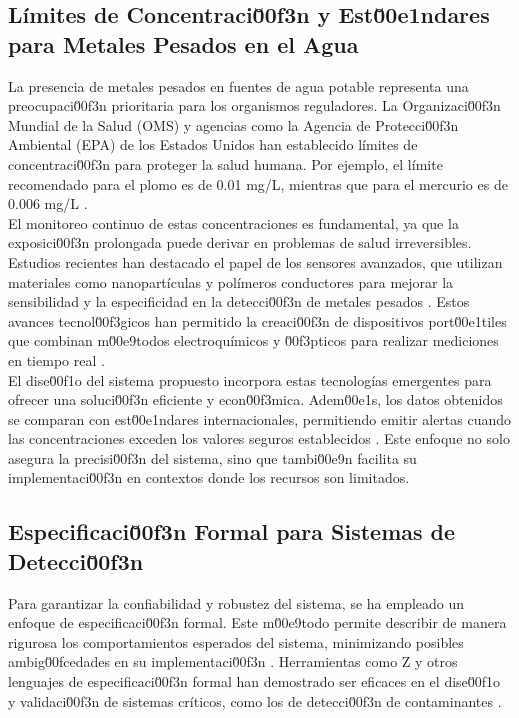 \subsection{Límites de Concentraci\u00f3n y Est\u00e1ndares para Metales Pesados en el Agua}

La presencia de metales pesados en fuentes de agua potable representa una preocupaci\u00f3n prioritaria para los organismos reguladores. La Organizaci\u00f3n Mundial de la Salud (OMS) y agencias como la Agencia de Protecci\u00f3n Ambiental (EPA) de los Estados Unidos han establecido límites de concentraci\u00f3n para proteger la salud humana. Por ejemplo, el límite recomendado para el plomo es de 0.01 mg/L, mientras que para el mercurio es de 0.006 mg/L \cite{truque2024, zaimee2021}.\\

El monitoreo continuo de estas concentraciones es fundamental, ya que la exposici\u00f3n prolongada puede derivar en problemas de salud irreversibles. Estudios recientes han destacado el papel de los sensores avanzados, que utilizan materiales como nanopartículas y polímeros conductores para mejorar la sensibilidad y la especificidad en la detecci\u00f3n de metales pesados \cite{yu2022, zhumanazar2022}. Estos avances tecnol\u00f3gicos han permitido la creaci\u00f3n de dispositivos port\u00e1tiles que combinan m\u00e9todos electroquímicos y \u00f3pticos para realizar mediciones en tiempo real \cite{ding2021, park2022}.\\

El dise\u00f1o del sistema propuesto incorpora estas tecnologías emergentes para ofrecer una soluci\u00f3n eficiente y econ\u00f3mica. Adem\u00e1s, los datos obtenidos se comparan con est\u00e1ndares internacionales, permitiendo emitir alertas cuando las concentraciones exceden los valores seguros establecidos \cite{rahimzadeh2017, shin2023}. Este enfoque no solo asegura la precisi\u00f3n del sistema, sino que tambi\u00e9n facilita su implementaci\u00f3n en contextos donde los recursos son limitados.\\

\subsection{Especificaci\u00f3n Formal para Sistemas de Detecci\u00f3n}

Para garantizar la confiabilidad y robustez del sistema, se ha empleado un enfoque de especificaci\u00f3n formal. Este m\u00e9todo permite describir de manera rigurosa los comportamientos esperados del sistema, minimizando posibles ambig\u00fcedades en su implementaci\u00f3n \cite{fitzgerald2007, woodcock1996}. Herramientas como Z y otros lenguajes de especificaci\u00f3n formal han demostrado ser eficaces en el dise\u00f1o y validaci\u00f3n de sistemas críticos, como los de detecci\u00f3n de contaminantes \cite{yu2022}.\\

